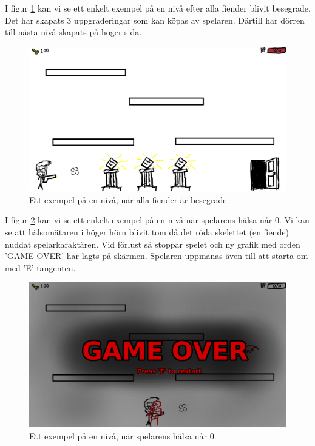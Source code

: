 \documentclass{TDP005mall}
\begin{document}
I figur \ref{fig:2} kan vi se ett enkelt exempel på en nivå efter alla fiender blivit besegrade. Det har skapats 3 uppgraderingar som kan köpas av spelaren. Därtill har dörren till nästa nivå skapats på höger sida.
\begin{figure}[H]
         \begin{center}
             \includegraphics[width=15cm]{Graphic/win_concept.png}
             \caption{\label{fig:2} Ett exempel på en nivå, när alla fiender är besegrade.}
         \end{center}
\end{figure}

I figur \ref{fig:3} kan vi se ett enkelt exempel på en nivå när spelarens hälsa når 0. Vi kan se att hälsomätaren i höger hörn blivit tom då det röda skelettet (en fiende) nuddat spelarkaraktären. Vid förlust så stoppar spelet och ny grafik med orden 'GAME OVER' har lagts på skärmen. Spelaren uppmanas även till att starta om med 'E' tangenten.
\begin{figure}[H]
         \begin{center}
             \includegraphics[width=15cm]{Graphic/lose_concept.png}
             \caption{\label{fig:3} Ett exempel på en nivå, när spelarens hälsa når 0.}
         \end{center}
\end{figure}
\end{document}
